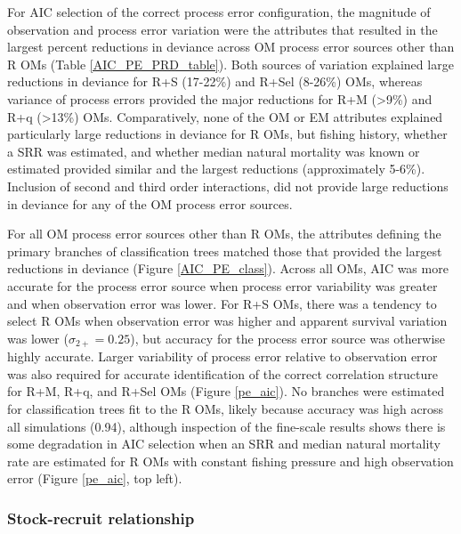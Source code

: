 \documentclass[
  12pt,
]{article}
\begin{document}
For AIC selection of the correct process error configuration, the
magnitude of observation and process error variation were the attributes
that resulted in the largest percent reductions in deviance across OM
process error sources other than R OMs (Table \ref{AIC_PE_PRD_table}).
Both sources of variation explained large reductions in deviance for R+S
(17-22\%) and R+Sel (8-26\%) OMs, whereas variance of process errors
provided the major reductions for R+M (\textgreater9\%) and R+q
(\textgreater13\%) OMs. Comparatively, none of the OM or EM attributes
explained particularly large reductions in deviance for R OMs, but
fishing history, whether a SRR was estimated, and whether median natural
mortality was known or estimated provided similar and the largest
reductions (approximately 5-6\%). Inclusion of second and third order
interactions, did not provide large reductions in deviance for any of
the OM process error sources.

For all OM process error sources other than R OMs, the attributes
defining the primary branches of classification trees matched those that
provided the largest reductions in deviance (Figure \ref{AIC_PE_class}).
Across all OMs, AIC was more accurate for the process error source when
process error variability was greater and when observation error was
lower. For R+S OMs, there was a tendency to select R OMs when
observation error was higher and apparent survival variation was lower
(\(\sigma_{2+} = 0.25\)), but accuracy for the process error source was
otherwise highly accurate. Larger variability of process error relative
to observation error was also required for accurate identification of
the correct correlation structure for R+M, R+q, and R+Sel OMs (Figure
\ref{pe_aic}). No branches were estimated for classification trees fit
to the R OMs, likely because accuracy was high across all simulations
(0.94), although inspection of the fine-scale results shows there is
some degradation in AIC selection when an SRR and median natural
mortality rate are estimated for R OMs with constant fishing pressure
and high observation error (Figure \ref{pe_aic}, top left).

\subsubsection*{Stock-recruit
relationship}\label{stock-recruit-relationship}
\end{document}
